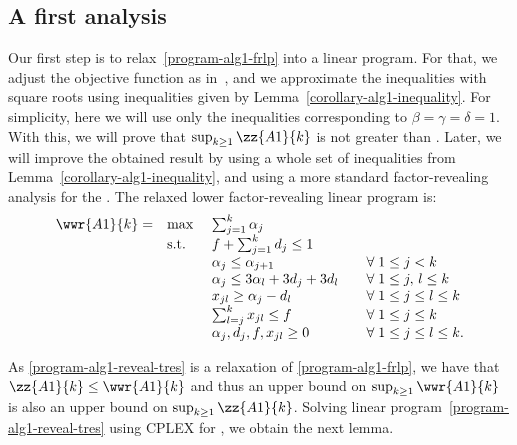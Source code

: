 \subsection{A first analysis}

Our first step is to relax~\eqref{program-alg1-frlp} into a linear
program. For that, we adjust the objective function as
in~\cite{JainMMSV03}, and we approximate the inequalities with square
roots using inequalities given by Lemma~\ref{corollary-alg1-inequality}. 
For simplicity, here we will use only the inequalities corresponding
to $\beta=\gamma=\delta=1$. With this, we will prove that $\sup_{k
  \geq 1}\zz{A1}{k}$ is not greater than .  Later, we
will improve the obtained result by using a whole set of inequalities
from Lemma~\ref{corollary-alg1-inequality}, and using a more standard
factor-revealing analysis for the \smflp. The relaxed lower
 factor-revealing linear program is:
\begin{equation}\label{program-alg1-reveal-tres}
\begin{array}{rlll}
\wwr{A1}{k} = & \mbox{\rm max  }  & \sum_{j=1}^{k} \alpha_j \\
      & \mbox{\rm s.t.}  & f + \sum_{j=1}^k d_j \le 1 & \\
      &                        & \alpha_j \le \alpha_{j+1}
                               & \quad \forall \; 1 \le j < k \\
      &                        & \alpha_j \le 3 \alpha_l + 3 d_j + 3 d_l
                               & \quad \forall \; 1 \le j, \, l \le k \\
      &                        & x_{jl} \ge  \alpha_j - d_l
                               & \quad \forall \; 1 \le j \le l \le k \\
      &                        & \sum_{l = j}^{k} x_{jl} \le f
                               & \quad \forall \; 1 \le j \le k \\
      &                        & \alpha_j, d_j, f, x_{jl} \ge 0
                               & \quad \forall \; 1 \le j \le l \le k.
\end{array}
\end{equation}

As \eqref{program-alg1-reveal-tres} is a relaxation of
\eqref{program-alg1-frlp}, we have that $\zz{A1}{k} \leq \wwr{A1}{k}$ and thus
an upper bound on $\sup_{k \geq 1}\wwr{A1}{k}$ is also an upper bound on
$\sup_{k \geq 1}\zz{A1}{k}$. Solving linear
program~\eqref{program-alg1-reveal-tres} using CPLEX for , we
obtain the next lemma.

